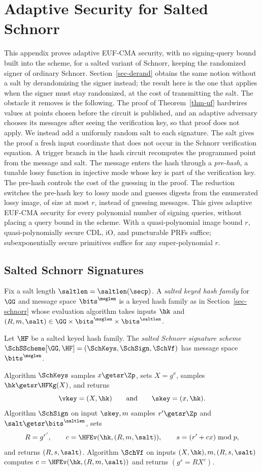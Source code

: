 \section{Adaptive Security for Salted Schnorr} \label{sec-adaptive}

This appendix proves adaptive EUF-CMA security, with no signing-query bound built into the scheme, for a salted variant of Schnorr, keeping the randomized signer of ordinary Schnorr. Section~\ref{sec-derand} obtains the same notion without a salt by derandomizing the signer instead; the result here is the one that applies when the signer must stay randomized, at the cost of transmitting the salt. The obstacle it removes is the following. The proof of Theorem~\ref{thm-uf} hardwires values at points chosen before the circuit is published, and an adaptive adversary chooses its messages after seeing the verification key, so that proof does not apply. We instead add a uniformly random salt to each signature. The salt gives the proof a fresh input coordinate that does not occur in the Schnorr verification equation. A trigger branch in the hash circuit recomputes the programmed point from the message and salt. The message enters the hash through a \emph{pre-hash}, a tunable lossy function in injective mode whose key is part of the verification key. The pre-hash controls the cost of the guessing in the proof. The reduction switches the pre-hash key to lossy mode and guesses digests from the enumerated lossy image, of size at most $r$, instead of guessing messages. This gives adaptive EUF-CMA security for every polynomial number of signing queries, without placing a query bound in the scheme. With a quasi-polynomial image bound $r$, quasi-polynomially secure CDL, iO, and puncturable PRFs suffice; subexponentially secure primitives suffice for any super-polynomial $r$.

\subsection{Salted Schnorr Signatures} \label{sec-salted}

Fix a salt length $\saltlen = \saltlen(\secp)$. A \emph{salted keyed hash family} for $\GG$ and message space $\bits^{\msglen}$ is a keyed hash family as in Section~\ref{sec-schnorr} whose evaluation algorithm takes inputs $\hk$ and $(R, m, \salt) \in \GG \times \bits^{\msglen} \times \bits^{\saltlen}$.

\begin{construction} \label{constr-salted-sch}
Let $\HF$ be a salted keyed hash family. The \emph{salted Schnorr signature scheme} $\SchSScheme[\GG,\HF]=(\SchKeys,\SchSign,\SchVf)$ has message space $\bits^{\msglen}$.

Algorithm $\SchKeys$ samples $x\getsr\Zp$, sets $X=g^x$, samples $\hk\getsr\HFKg(X)$, and returns
$$
\vkey=(X,\hk)
\qquad\text{and}\qquad
\skey=(x,\hk).
$$
Algorithm $\SchSign$ on input $\skey,m$ samples $r'\getsr\Zp$ and $\salt\getsr\bits^{\saltlen}$, sets
$$
R=g^{r'},
\qquad
c=\HFEv(\hk,(R,m,\salt)),
\qquad
s=(r'+cx)\bmod p,
$$
and returns $(R,s,\salt)$. Algorithm $\SchVf$ on inputs $(X,\hk),m,(R,s,\salt)$ computes $c=\HFEv(\hk,(R,m,\salt))$ and returns $(g^s=RX^c)$.
\end{construction}

